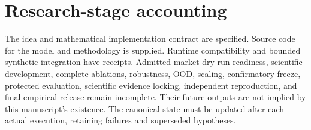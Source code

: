 \documentclass[11pt,a4paper]{article}
\begin{document}
\section{Research-stage accounting}
The idea and mathematical implementation contract are specified. Source code for the model and methodology is supplied. Runtime compatibility and bounded synthetic integration have receipts. Admitted-market dry-run readiness, scientific development, complete ablations, robustness, OOD, scaling, confirmatory freeze, protected evaluation, scientific evidence locking, independent reproduction, and final empirical release remain incomplete. Their future outputs are not implied by this manuscript's existence. The canonical state must be updated after each actual execution, retaining failures and superseded hypotheses.



\end{document}
